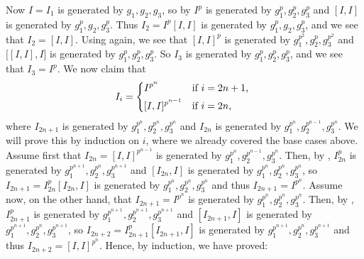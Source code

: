 Now $I = I_{1}$ is generated by $g_{1},g_{2},g_{3}$, so by  $I^{p}$ is generated by $g_{1}^{p},g_{2}^{p},g_{3}^{p}$ and $[I,I]$ is generated by $g_{1}^{p},g_{2},g_{3}^{p}$. Thus $I_{2} = I^{p}[I,I]$ is generated by $g_{1}^{p},g_{2},g_{3}^{p}$, and we see that $I_{2} = [I,I]$. Using  again, we see that $[I,I]^{p}$ is generated by $g_{1}^{p^{2}},g_{2}^{p},g_{3}^{p^{2}}$ and $\bigl[ [I,I],I \bigr]$ is generated by $g_{1}^{p},g_{2}^{p},g_{3}^{p}$. So $I_{3}$ is generated by $g_{1}^{p},g_{2}^{p},g_{3}^{p}$, and we see that $I_{3} = I^{p}$. We now claim that
\begin{equation*}
  I_{i} =
  \begin{dcases*}
    I^{p^{n}} & if $i = 2n+1$, \\
    [I,I]^{p^{n-1}} & if $i = 2n$,
  \end{dcases*}
\end{equation*}
where $I_{2n+1}$ is generated by $g_{1}^{p^{n}},g_{2}^{p^{n}},g_{3}^{p^{n}}$ and $I_{2n}$ is generated by $g_{1}^{p^{n}},g_{2}^{p^{n-1}},g_{3}^{p^{n}}$. We will prove this by induction on $i$, where we already covered the base cases above. Assume first that $I_{2n} = [I,I]^{p^{n-1}}$ is generated by $g_{1}^{p^{n}},g_{2}^{p^{n-1}},g_{3}^{p^{n}}$. Then, by , $I_{2n}^{p}$ is generated by $g_{1}^{p^{n+1}},g_{2}^{p^{n}},g_{3}^{p^{n+1}}$ and $[I_{2n},I]$ is generated by $g_{1}^{p^{n}},g_{2}^{p^{n}},g_{3}^{p^{n}}$, so $I_{2n+1} = I_{2n}^{p}[I_{2n},I]$ is generated by $g_{1}^{p^{n}}, g_{2}^{p^{n}}, g_{3}^{p^{n}}$ and thus $I_{2n+1} = I^{p^{n}}$. Assume now, on the other hand, that $I_{2n+1} = I^{p^{n}}$ is generated by $g_{1}^{p^{n}}, g_{2}^{p^{n}}, g_{3}^{p^{n}}$. Then, by , $I_{2n+1}^{p}$ is generated by $g_{1}^{p^{n+1}}, g_{2}^{p^{n+1}}, g_{3}^{p^{n+1}}$ and $[I_{2n+1},I]$ is generated by $g_{1}^{p^{n+1}}, g_{2}^{p^{n}}, g_{3}^{p^{n+1}}$, so $I_{2n+2} = I_{2n+1}^{p}[I_{2n+1},I]$ is generated by $g_{1}^{p^{n+1}}, g_{2}^{p^{n}}, g_{3}^{p^{n+1}}$ and thus $I_{2n+2} = [I,I]^{p^{n}}$. Hence, by induction, we have proved:

